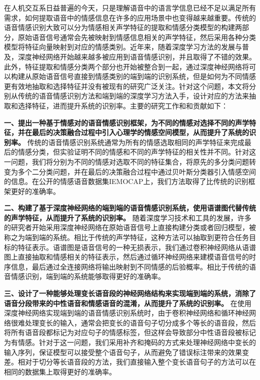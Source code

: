 \begin{cabstract}
  在人机交互系日益普遍的今天，只是理解语音中的语言学信息已经不足以满足所有需求，如何提取语音中的情感信息在许多的应用场景中也变得越来越重要。传统的语音情感识别大致可以分为情感相关声学特征的提取和情感分类模型的构建两部分，原始语音信号通常会先被映射到情感信息相关的声学特征，然后采用各种分类模型将特征向量映射到对应的情感类别。近年来，随着深度学习方法的发展与普及，深度神经网络开始越来越多被应用到语音情感识别，并且取得了不错的效果。此外，特征提取和情感分类两个部分也开始被整合到一起，通过深度神经网络将可以构建从原始语音信号直接到情感类别的端到端的识别系统，但是如何为不同情感更有效地抽取和选择特征并没有被现有的研究广泛关注。针对这个问题，本文将分别从传统的语音情感识别方法和端到端的深度学习方法入手，设计对应的方法来抽取和选择特征，进而提升系统的识别率。主要的研究工作和和贡献如下：
 
\textbf{一、提出一种基于情感对的语音情感识别框架，为不同的情感对选择不同的声学特征，并在最后的决策融合过程中引入心理学的情感空间模型，从而提升了系统的识别率。} 传统的语音情感识别系统通常为所有的情感选取相同的声学特征来完成最后的情感分类，但实验证明不同的情感和不同的声学特征的相关性并不同。针对这一问题，我们将分别为不同的情感对选取不同的特征集合，将原先的多分类问题转变为多个二分类问题，并在最后的决策融合过程中通过贝叶斯分类器引入情感空间的信息。在公开的情感语音数据集IEMOCAP上，我们方法取得了比传统的识别框架更好的准确率。

\textbf{二、构建了基于深度神经网络的端到端的语音情感识别系统，使用语谱图代替传统的声学特征，从而提升了系统的识别率。} 随着深度学习技术和工具的发展，许多的研究者开始采用深度神经网络在原始语音信号上直接构建分类或者回归模型，被称之为端到端的系统。相比于传统的声学特征，这种方法可以抽取到更符合任务目标的特征表示。语谱图是语音信号的一种无损表示，我们通过卷积神经网络从语谱图上直接抽取和情感相关的特征表示，然后通过循环神经网络来建模语音信号的时序信息，最后通过全连接网络将输出映射到不同情感的后验概率。相比于传统的语音情感识别，端到端的系统能够取得更好的准确率。

\textbf{三、设计了一种能够处理变长语音段的神经网络结构来实现端到端的系统，消除了语音分段带来的中性语音和情感语音的混淆，从而提升了系统的识别率。} 在使用深度神经网络实现端到端的语音情感识别系统时，由于卷积神经网络和循环神经网络很难处理变长的输入，通常会把变长的语音句子切分成多个等长的语音段，然后将所有语音段都标记为对应句子的情感标签，但这样会导致部分中性语音段被标记为有情感。针对于这一问题，我们采用补齐和掩码的方式来处理神经网络中变长的输入序列，保证模型可以接受整个语音句子，从而避免了错误标注带来的效果变差。相对于切分等长语音段的方法，我们直接输入整个变长语音句子的方法可以在相同的数据集上取得更好的准确率。
 
\end{cabstract}

